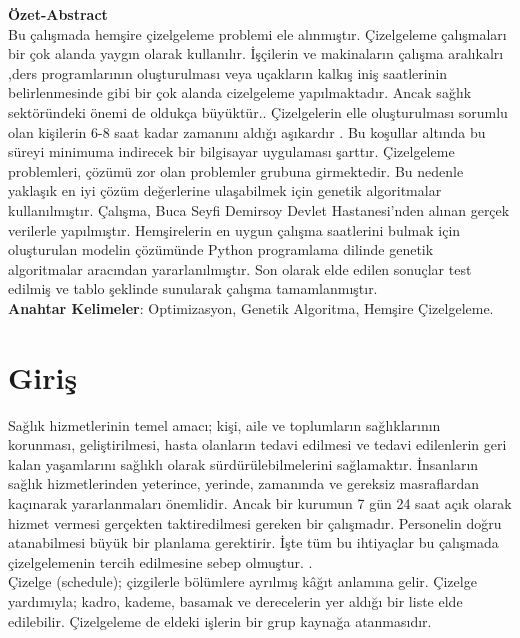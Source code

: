 \documentclass[12pt, a4paper]{article}
\begin{document}
	\begin{flushleft}
	
	
	\textbf{Özet-Abstract}\\
	Bu çalışmada hemşire çizelgeleme problemi ele alınmıştır. 
	Çizelgeleme çalışmaları bir çok alanda  yaygın olarak kullanılır. İşçilerin ve  makinaların çalışma aralıkalrı ,ders programlarının oluşturulması veya uçakların kalkış iniş saatlerinin belirlenmesinde gibi bir çok alanda cizelgeleme  
	 yapılmaktadır. Ancak sağlık sektöründeki önemi de oldukça 
	büyüktür.. Çizelgelerin elle 
	oluşturulması sorumlu olan kişilerin 6-8 saat kadar zamanını 
	aldığı aşıkardır . Bu koşullar altında bu süreyi minimuma indirecek bir 
	bilgisayar uygulaması şarttır. Çizelgeleme problemleri, çözümü zor olan 
	problemler grubuna girmektedir. Bu nedenle yaklaşık en iyi çözüm değerlerine 
	ulaşabilmek için genetik algoritmalar kullanılmıştır. Çalışma, Buca Seyfi Demirsoy Devlet Hastanesi’nden alınan gerçek 
	verilerle yapılmıştır. Hemşirelerin en uygun 
	çalışma saatlerini bulmak için oluşturulan modelin çözümünde Python programlama  dilinde  
	genetik algoritmalar aracından yararlanılmıştır. Son olarak elde 
	edilen sonuçlar test edilmiş ve tablo şeklinde sunularak çalışma 
	tamamlanmıştır.\\[5pt]
	\textbf{Anahtar  Kelimeler}: Optimizasyon, Genetik Algoritma, Hemşire Çizelgeleme.

	


	\section{Giriş}	
	Sağlık hizmetlerinin temel amacı; kişi, aile ve toplumların sağlıklarının 
	korunması, geliştirilmesi, hasta olanların tedavi edilmesi ve tedavi edilenlerin geri 
	kalan yaşamlarını sağlıklı olarak sürdürülebilmelerini sağlamaktır. İnsanların sağlık 
	hizmetlerinden yeterince, yerinde, zamanında ve gereksiz masraflardan kaçınarak 
	yararlanmaları önemlidir. Ancak bir kurumun 7 gün 24 saat açık olarak hizmet 
	vermesi gerçekten taktiredilmesi gereken bir  çalışmadır. Personelin doğru atanabilmesi büyük bir 
	planlama gerektirir. İşte tüm bu ihtiyaçlar bu çalışmada çizelgelemenin tercih edilmesine 
	sebep olmuştur. . \\[15pt]
	
	
	
	Çizelge (schedule); çizgilerle bölümlere ayrılmış kâğıt anlamına gelir. 
	Çizelge yardımıyla; kadro, kademe, basamak ve derecelerin yer aldığı bir liste elde 
	edilebilir. Çizelgeleme de eldeki işlerin bir grup kaynağa atanmasıdır.\cite{inancc2020solving}\\[15pt]
	

\end{flushleft}
\end{document}
